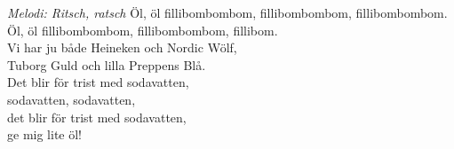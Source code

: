 {\footnotesize\textit{Melodi: Ritsch, ratsch}}
\vspace{10pt}
Öl, öl fillibombombom, fillibombombom, fillibombombom.\\
Öl, öl fillibombombom, fillibombombom, fillibom.\\
Vi har ju både Heineken och Nordic Wölf,\\
Tuborg Guld och lilla Preppens Blå.\\
Det blir för trist med sodavatten,\\
sodavatten, sodavatten,\\
det blir för trist med sodavatten,\\
ge mig lite öl!
